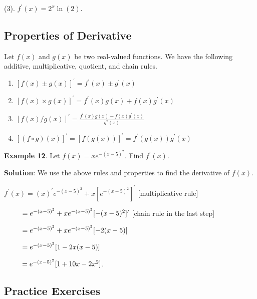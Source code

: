 \documentclass[
]{book}
\begin{document}
(3). \(f^\prime (x) = 2^x \ln(2)\).

\hfill\break

\hypertarget{properties-of-derivative}{%
\subsection{Properties of Derivative}\label{properties-of-derivative}}

Let \(f(x)\) and \(g(x)\) be two real-valued functions. We have the following additive, multiplicative, quotient, and chain rules.

\begin{enumerate}
\def\labelenumi{\arabic{enumi}.}
\item
  \([f(x) \pm g(x)]^\prime = f^\prime(x) \pm g^\prime(x)\)
\item
  \([f(x)\times g(x)]^\prime = f^\prime (x)g(x) + f(x)g^\prime (x)\)
\item
  \([f(x)/g(x)]^\prime = \frac{f^\prime (x)g(x) - f(x)g^\prime (x)}{g^2(x)}\)
\item
  \([(f\circ g) (x)]^\prime = [f(g(x))]^\prime = f^\prime(g(x))g^\prime(x)\)
\end{enumerate}

\hfill\break

\textbf{Example 12}. Let \(f(x) = xe^{-(x-5)^2}\). Find \(f^\prime (x)\).

\textbf{Solution}: We use the above rules and properties to find the derivative of \(f(x)\).

\(f^\prime(x) = (x)^\prime e^{-(x -5)^2} + x[e^{-(x-5)^2}]^\prime\) {[}multiplicative rule{]}

\(\hspace{9mm}= e^{-(x -5)^2} +x e^{-(x -5)^2}[-(x-5)^2]^\prime\) {[}chain rule in the last step{]}

\(\hspace{9mm}= e^{-(x -5)^2} +x e^{-(x -5)^2}[-2(x-5)]\)

\(\hspace{9mm}= e^{-(x -5)^2}[1 -2x(x-5)]\)

\(\hspace{9mm}= e^{-(x -5)^2}[1 +10x -2x^2]\).

\hfill\break

\hypertarget{practice-exercises-1}{%
\subsection{Practice Exercises}\label{practice-exercises-1}}
\end{document}
